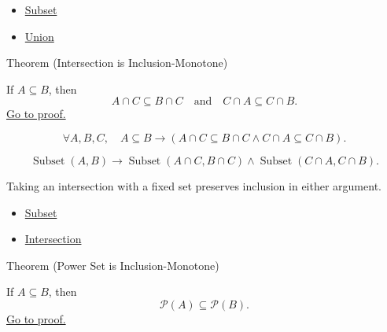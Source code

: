 \begin{dependencies}
\begin{itemize}
  \item \hyperref[def:subset]{Subset}
  \item \hyperref[def:union]{Union}
\end{itemize}
\end{dependencies}

\begin{theorembox}{Theorem (Intersection is Inclusion-Monotone)}
\begin{theorem}\label{thm:intersection-monotone-inclusion}
If $A\subseteq B$, then
\[
A\cap C\subseteq B\cap C
\quad\text{and}\quad
C\cap A\subseteq C\cap B.
\]
\hyperref[prf:intersection-monotone-inclusion]{Go to proof.}
\end{theorem}
\end{theorembox}


\begin{remark*}
\[
  \forall A,B,C,\quad
  A\subseteq B\to (A\cap C\subseteq B\cap C\wedge C\cap A\subseteq C\cap B).
\]
\end{remark*}

\begin{remark*}
\[
  \operatorname{Subset}(A,B)
  \to
  \operatorname{Subset}(A\cap C,B\cap C)
  \wedge
  \operatorname{Subset}(C\cap A,C\cap B).
\]
\end{remark*}

\begin{remark*}[Interpretation]
Taking an intersection with a fixed set preserves inclusion in either argument.
\end{remark*}

\begin{dependencies}
\begin{itemize}
  \item \hyperref[def:subset]{Subset}
  \item \hyperref[def:intersection]{Intersection}
\end{itemize}
\end{dependencies}

\begin{theorembox}{Theorem (Power Set is Inclusion-Monotone)}
\begin{theorem}\label{thm:power-set-monotone-inclusion}
If $A\subseteq B$, then
\[
\mathcal{P}(A)\subseteq\mathcal{P}(B).
\]
\hyperref[prf:power-set-monotone-inclusion]{Go to proof.}
\end{theorem}
\end{theorembox}

